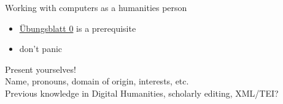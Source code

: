 \begin{frame}{Working with computers as a humanities person}

\begin{itemize}
    \item \href{https://static.uni-graz.at/fileadmin/gewi-zentren/Informationsmodellierung/PDF/U__bungsblatt-0.pdf}{Übungsblatt 0} is a prerequisite
    \item don't panic
\end{itemize}
    
\end{frame}

\begin{frame}[standout]
    \alert{Present yourselves! } \\
    \normalsize
    Name, pronouns, domain of origin, interests, etc. \\
    Previous knowledge in Digital Humanities, scholarly editing, XML/TEI?
\end{frame}


